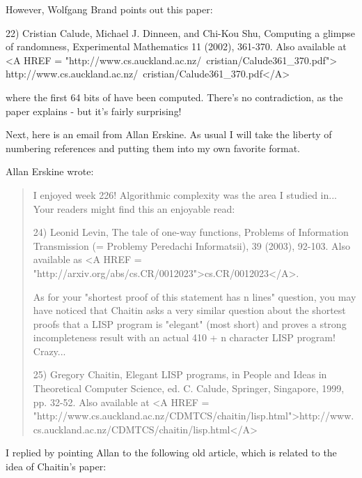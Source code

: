 However, Wolfgang Brand points out this paper:

22) Cristian Calude, Michael J. Dinneen, and Chi-Kou Shu,
Computing a glimpse of randomness,
Experimental Mathematics 11 (2002), 361-370.  Also available at
<A HREF = "http://www.cs.auckland.ac.nz/~cristian/Calude361_370.pdf"> 
http://www.cs.auckland.ac.nz/~cristian/Calude361_370.pdf</A>

where the first 64 bits of \Omega  have been computed.  
There's no contradiction, as the paper explains - but it's
fairly surprising!

Next, here is an email from Allan Erskine.  As usual
I will take the liberty of numbering references and putting
them into my own favorite format.  

Allan Erskine wrote:

\begin{quote}
I enjoyed week 226!  Algorithmic complexity was the area I studied  
in... Your readers might find this an enjoyable read:

24) Leonid Levin, The tale of one-way functions,
Problems of Information Transmission (= Problemy Peredachi Informatsii), 
39 (2003), 92-103.  Also 
available as <A HREF = "http://arxiv.org/abs/cs.CR/0012023">cs.CR/0012023</A>.
 
As for your "shortest proof of this statement has n lines" question,  
you may have noticed that Chaitin asks a very similar question about  
the shortest proofs that a LISP program is "elegant" (most short) and  
proves a strong incompleteness result with an actual 410 + n  
character LISP program!  Crazy...

25) Gregory Chaitin, Elegant LISP programs, in 
People and Ideas in Theoretical Computer Science, ed. C. Calude,
Springer, Singapore, 1999, pp. 32-52.  Also available at
<A HREF = "http://www.cs.auckland.ac.nz/CDMTCS/chaitin/lisp.html">http://www.cs.auckland.ac.nz/CDMTCS/chaitin/lisp.html</A>

\end{quote}
I replied by pointing Allan to the following old article,
which is related to the idea of Chaitin's paper:

